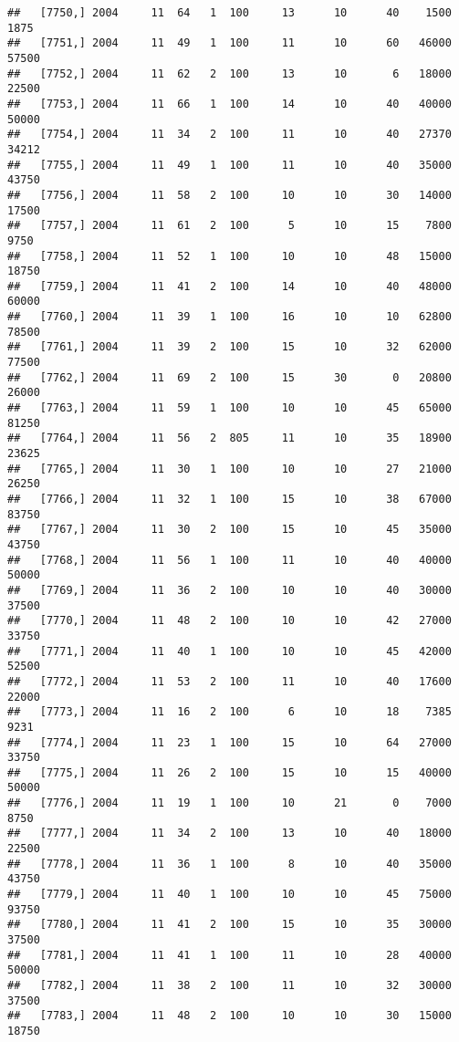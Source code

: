 \documentclass{article}\usepackage[]{graphicx}\usepackage[]{color}
\makeatletter
\newenvironment{kframe}{%
 \def\at@end@of@kframe{}%
 \ifinner\ifhmode%
  \def\at@end@of@kframe{\end{minipage}}%
  \begin{minipage}{\columnwidth}%
 \fi\fi%
 \def\FrameCommand##1{\hskip\@totalleftmargin \hskip-\fboxsep
 \colorbox{shadecolor}{##1}\hskip-\fboxsep
     \hskip-\linewidth \hskip-\@totalleftmargin \hskip\columnwidth}%
 \MakeFramed {\advance\hsize-\width
   \@totalleftmargin\z@ \linewidth\hsize
   \@setminipage}}%
 {\par\unskip\endMakeFramed%
 \at@end@of@kframe}
\newenvironment{knitrout}{}{} %
\makeatother
\begin{document}
\begin{knitrout}
\begin{kframe}
\begin{verbatim}
##   [7750,] 2004     11  64   1  100     13      10      40    1500    1875
##   [7751,] 2004     11  49   1  100     11      10      60   46000   57500
##   [7752,] 2004     11  62   2  100     13      10       6   18000   22500
##   [7753,] 2004     11  66   1  100     14      10      40   40000   50000
##   [7754,] 2004     11  34   2  100     11      10      40   27370   34212
##   [7755,] 2004     11  49   1  100     11      10      40   35000   43750
##   [7756,] 2004     11  58   2  100     10      10      30   14000   17500
##   [7757,] 2004     11  61   2  100      5      10      15    7800    9750
##   [7758,] 2004     11  52   1  100     10      10      48   15000   18750
##   [7759,] 2004     11  41   2  100     14      10      40   48000   60000
##   [7760,] 2004     11  39   1  100     16      10      10   62800   78500
##   [7761,] 2004     11  39   2  100     15      10      32   62000   77500
##   [7762,] 2004     11  69   2  100     15      30       0   20800   26000
##   [7763,] 2004     11  59   1  100     10      10      45   65000   81250
##   [7764,] 2004     11  56   2  805     11      10      35   18900   23625
##   [7765,] 2004     11  30   1  100     10      10      27   21000   26250
##   [7766,] 2004     11  32   1  100     15      10      38   67000   83750
##   [7767,] 2004     11  30   2  100     15      10      45   35000   43750
##   [7768,] 2004     11  56   1  100     11      10      40   40000   50000
##   [7769,] 2004     11  36   2  100     10      10      40   30000   37500
##   [7770,] 2004     11  48   2  100     10      10      42   27000   33750
##   [7771,] 2004     11  40   1  100     10      10      45   42000   52500
##   [7772,] 2004     11  53   2  100     11      10      40   17600   22000
##   [7773,] 2004     11  16   2  100      6      10      18    7385    9231
##   [7774,] 2004     11  23   1  100     15      10      64   27000   33750
##   [7775,] 2004     11  26   2  100     15      10      15   40000   50000
##   [7776,] 2004     11  19   1  100     10      21       0    7000    8750
##   [7777,] 2004     11  34   2  100     13      10      40   18000   22500
##   [7778,] 2004     11  36   1  100      8      10      40   35000   43750
##   [7779,] 2004     11  40   1  100     10      10      45   75000   93750
##   [7780,] 2004     11  41   2  100     15      10      35   30000   37500
##   [7781,] 2004     11  41   1  100     11      10      28   40000   50000
##   [7782,] 2004     11  38   2  100     11      10      32   30000   37500
##   [7783,] 2004     11  48   2  100     10      10      30   15000   18750

\end{verbatim}
\end{kframe}
\end{knitrout}
\end{document}
